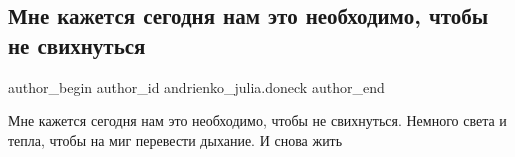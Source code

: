  
 
 
 
 
 
\subsection{Мне кажется сегодня нам это необходимо, чтобы не свихнуться}
\label{sec:26_12_2016.fb.andrienko_julia.doneck.1.sveta_i_tepla}
 
\ifcmt
 author_begin
   author_id andrienko_julia.doneck
 author_end
\fi

Мне кажется сегодня нам это необходимо, чтобы не свихнуться. Немного света и
тепла, чтобы на миг перевести дыхание. И снова жить


